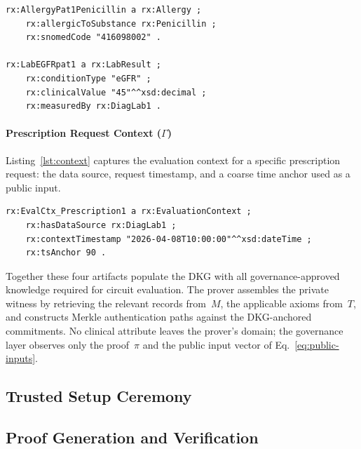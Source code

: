 \documentclass[journal]{IEEEtran}
\begin{document}
\begin{lstlisting}[caption={Patient Clinical Data},label={lst:patient},language=turtle,basicstyle=\ttfamily\footnotesize]
rx:AllergyPat1Penicillin a rx:Allergy ;
    rx:allergicToSubstance rx:Penicillin ;
    rx:snomedCode "416098002" .

rx:LabEGFRpat1 a rx:LabResult ;
    rx:conditionType "eGFR" ;
    rx:clinicalValue "45"^^xsd:decimal ;
    rx:measuredBy rx:DiagLab1 .
\end{lstlisting}

\paragraph{Prescription Request Context ($\Gamma$)}
Listing~\ref{lst:context} captures the evaluation context for a
specific prescription request: the data source, request timestamp,
and a coarse time anchor used as a public input.

\begin{lstlisting}[caption={Prescription Request Context},label={lst:context},language=turtle,basicstyle=\ttfamily\footnotesize]
rx:EvalCtx_Prescription1 a rx:EvaluationContext ;
    rx:hasDataSource rx:DiagLab1 ;
    rx:contextTimestamp "2026-04-08T10:00:00"^^xsd:dateTime ;
    rx:tsAnchor 90 .
\end{lstlisting}

Together these four artifacts populate the DKG with all
governance-approved knowledge required for circuit evaluation. The
prover assembles the private witness by retrieving the relevant
records from~$M$, the applicable axioms from~$T$, and constructs
Merkle authentication paths against the DKG-anchored commitments.
No clinical attribute leaves the prover's domain; the governance
layer observes only the proof~$\pi$ and the public input vector
of Eq.~\ref{eq:public-inputs}.

\subsection{Trusted Setup Ceremony}
\label{ss:ceremony}



\subsection{Proof Generation and Verification}
\label{ss:proof-gen}
\end{document}
